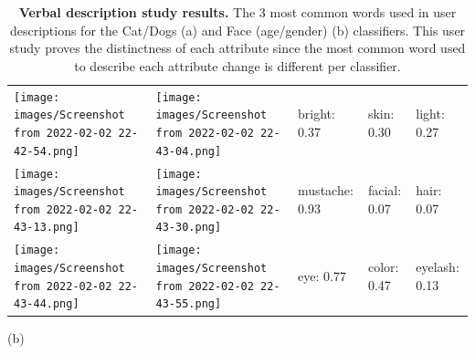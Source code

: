 \begin{table}[H]
\begin{minipage}{.8\linewidth}
{\begin{tabular}{m{1.5cm}|m{1.5cm}|m{2.4cm}|m{2.4cm}|m{2.4cm}}
\texttt{[image: images/Screenshot from 2022-02-02 22-42-54.png]} & \texttt{[image: images/Screenshot from 2022-02-02 22-43-04.png]} & {bright: 0.37} & {skin: 0.30} & light: 0.27     \\
\texttt{[image: images/Screenshot from 2022-02-02 22-43-13.png]} & \texttt{[image: images/Screenshot from 2022-02-02 22-43-30.png]} & {mustache: 0.93} & {facial: 0.07} & hair: 0.07      \\
\texttt{[image: images/Screenshot from 2022-02-02 22-43-44.png]} & \texttt{[image: images/Screenshot from 2022-02-02 22-43-55.png]} & {eye:  0.77} & {color: 0.47} & eyelash: 0.13  
\end{tabular}}
\caption*{(b)}
\end{minipage}
\caption{\textbf{Verbal description study results.} The 3 most common words used in user descriptions for the Cat/Dogs (a) and Face (age/gender) (b) classifiers. This user study proves the distinctness of each attribute since the most common word used to describe each attribute change is different per classifier.}
\label{tab:top3}
\end{table}

